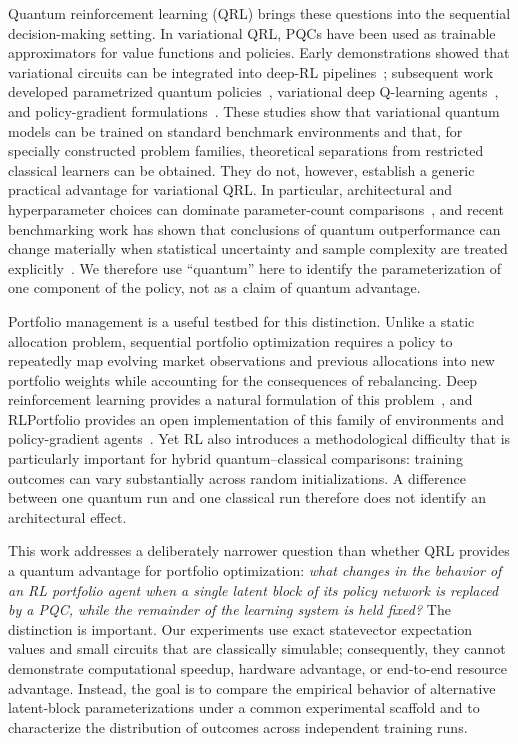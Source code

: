 \documentclass[aps,floatfix,superscriptaddress,twocolumn,tightenlines,amsmath,amssymb,nofootinbib,10pt,longbibliography,prl]{revtex4-2}
\begin{document}
Quantum reinforcement learning (QRL) brings these questions into the sequential decision-making setting. In variational QRL, PQCs have been used as trainable approximators for value functions and policies. Early demonstrations showed that variational circuits can be integrated into deep-RL pipelines~\cite{Chen2020VariationalQuantumCi}; subsequent work developed parametrized quantum policies~\cite{Jerbi2021ParametrizedQuantumP}, variational deep Q-learning agents~\cite{Skolik2022QuantumagentsintheGy}, and policy-gradient formulations~\cite{Sequeira2023Policygradientsusing}. These studies show that variational quantum models can be trained on standard benchmark environments and that, for specially constructed problem families, theoretical separations from restricted classical learners can be obtained. They do not, however, establish a generic practical advantage for variational QRL. In particular, architectural and hyperparameter choices can dominate parameter-count comparisons~\cite{Skolik2022QuantumagentsintheGy}, and recent benchmarking work has shown that conclusions of quantum outperformance can change materially when statistical uncertainty and sample complexity are treated explicitly~\cite{Meyer2025BenchmarkingQuantumR}. We therefore use ``quantum'' here to identify the parameterization of one component of the policy, not as a claim of quantum advantage.

Portfolio management is a useful testbed for this distinction. Unlike a static allocation problem, sequential portfolio optimization requires a policy to repeatedly map evolving market observations and previous allocations into new portfolio weights while accounting for the consequences of rebalancing. Deep reinforcement learning provides a natural formulation of this problem~\cite{jiang2017deepreinforcementlearningframework}, and RLPortfolio provides an open implementation of this family of environments and policy-gradient agents~\cite{RLportfolio}. Yet RL also introduces a methodological difficulty that is particularly important for hybrid quantum--classical comparisons: training outcomes can vary substantially across random initializations. A difference between one quantum run and one classical run therefore does not identify an architectural effect.

This work addresses a deliberately narrower question than whether QRL provides a quantum advantage for portfolio optimization: \emph{what changes in the behavior of an RL portfolio agent when a single latent block of its policy network is replaced by a PQC, while the remainder of the learning system is held fixed?} The distinction is important. Our experiments use exact statevector expectation values and small circuits that are classically simulable; consequently, they cannot demonstrate computational speedup, hardware advantage, or end-to-end resource advantage. Instead, the goal is to compare the empirical behavior of alternative latent-block parameterizations under a common experimental scaffold and to characterize the distribution of outcomes across independent training runs.
\end{document}
